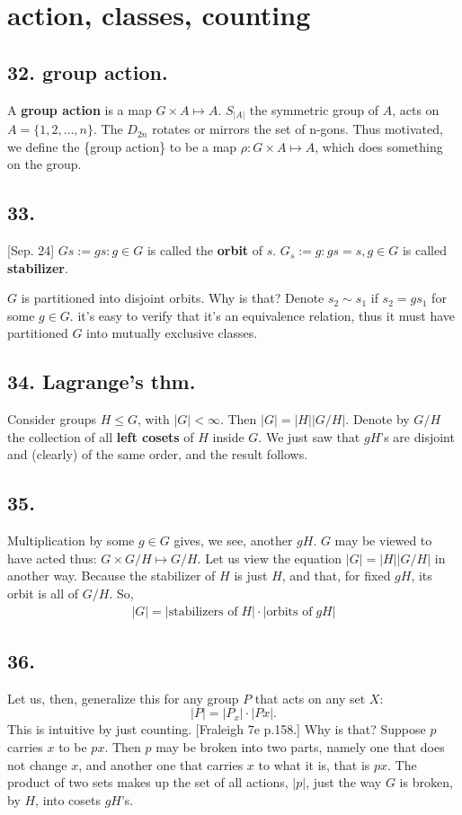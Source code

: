 \documentclass[12pt]{article}
\newcommand\oo\infty%
\newcommand\M\cdot%
\newcommand\X\times%
\newcommand\Mp\mapsto%
\newcommand{\Ss}[1]{\textsf{\textbf{#1}}}%
\newcommand{\EqGo}[1]{ \begin{gather*}{#1}\end{gather*} } %
\begin{document}
\section{action, classes, counting}
\subsection*{32. group action.} A \Ss{group action} is a map \(G \X A \Mp A\). 
\(S_{|A|}\) the symmetric group of \(A\), acts on \(A= \{1,2,\dotsc,n\}\). 
The \(D_{2n}\) rotates or mirrors the set of n-gons. 
Thus motivated, we define the \{group action\} to be a map \(\rho: G \X A \Mp A\), which does something on the group. 

\subsection*{33.} [Sep. 24] \(Gs := {gs: g \in G}\) is called the \Ss{orbit} of \(s\). 
\(G_s := {g: gs =s, g \in G}\) is called \Ss{stabilizer}. \par
\(G\) is partitioned into disjoint orbits. 
Why is that? Denote \(s_2 \sim s_1\) if \(s_2 = gs_1\) for some \(g \in G\). 
it's easy to verify that it's an equivalence relation, 
thus it must have partitioned \(G\) into mutually exclusive classes. 

\subsection*{34. Lagrange's thm.} Consider groups \(H \leq G\), with \(|G|<\oo\). Then \(|G| = |H| |G/H|\). 
Denote by \(G/H\) the collection of all \Ss{left cosets} of \(H\) inside \(G\). 
We just saw that \(gH\)'s are disjoint and (clearly) of the same order, and the result follows. 

\subsection*{35.} Multiplication by some \(g \in G\) gives, we see, another \(gH\). 
\(G\) may be viewed to have acted thus: \(G \X G/H \Mp G/H\). 
Let us view the equation \(|G| = |H| |G/H|\) in another way. 
Because the stabilizer of \(H\) is just \(H\), 
and that, for fixed \(gH\), its orbit is all of \(G/H\). So, \EqGo{
 |G| = |\textrm{stabilizers of}\; H| \M |\textrm{orbits of}\; gH|
}

\subsection*{36.} Let us, then, generalize this for any group \(P\) that acts on any set \(X\): \[
|P| = |P_x| \M |Px|. 
\] This is intuitive by just counting. 
[Fraleigh 7e p.158.] Why is that? Suppose \(p\) carries \(x\) to be \(px\). 
Then \(p\) may be broken into two parts, namely one that does not change \(x\), and another one that carries \(x\) to what it is, that is \(px\). 
The product of two sets makes up the set of all actions, \(|p|\), just the way \(G\) is broken, by \(H\), into cosets \(gH\)'s. 
\end{document}
